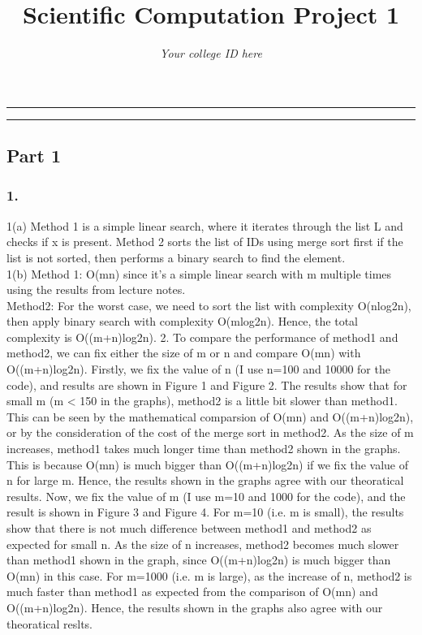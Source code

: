 \documentclass{article}
\title{Scientific Computation Project 1}
\author{\emph{Your college ID here}}
\begin{document}
\maketitle

\hrule
\hrule

\subsection*{Part 1}


\subsubsection*{1.}
1(a) Method 1 is a simple linear search,
where it iterates through the list L and checks if x is present.
Method 2 sorts the list of IDs using merge sort first if the list is not sorted, 
then performs a binary search to find the element. \\
1(b) Method 1: O(mn) since it's a simple linear search with m multiple times using
the results from lecture notes. \\
Method2: For the worst case, we need to sort the list with complexity O(nlog2n),
then apply binary search with complexity O(mlog2n).
Hence, the total complexity is O((m+n)log2n). 
2. To compare the performance of method1 and method2, we can fix either the size of
m or n and compare O(mn) with O((m+n)log2n). 
Firstly, we fix the value of n (I use n=100 and 10000 for the code), and results are shown
in Figure 1 and Figure 2. The results show that for small m (m < 150 in the graphs),
method2 is a little bit slower than method1. This can be seen by the mathematical
comparsion of O(mn) and O((m+n)log2n), or by the consideration of the cost of the merge sort
in method2. As the size of m increases, method1 takes much longer time than method2 shown
in the graphs. This is because O(mn) is much bigger than O((m+n)log2n) if we fix the value of
n for large m. Hence, the results shown in the graphs agree with our theoratical results.
Now, we fix the value of m (I use m=10 and 1000 for the code), and the result is shown
in Figure 3 and Figure 4. For m=10 (i.e. m is small), the results show that there is not much
difference between method1 and method2 as expected for small n. As the size of n increases,
method2 becomes much slower than method1 shown in the graph, since O((m+n)log2n) is much bigger than O(mn)
in this case. For m=1000 (i.e. m is large), as the increase of n, method2 is much faster than method1
as expected from the comparison of O(mn) and O((m+n)log2n). Hence, the results shown in the graphs also agree
with our theoratical reslts.  
\end{document}
